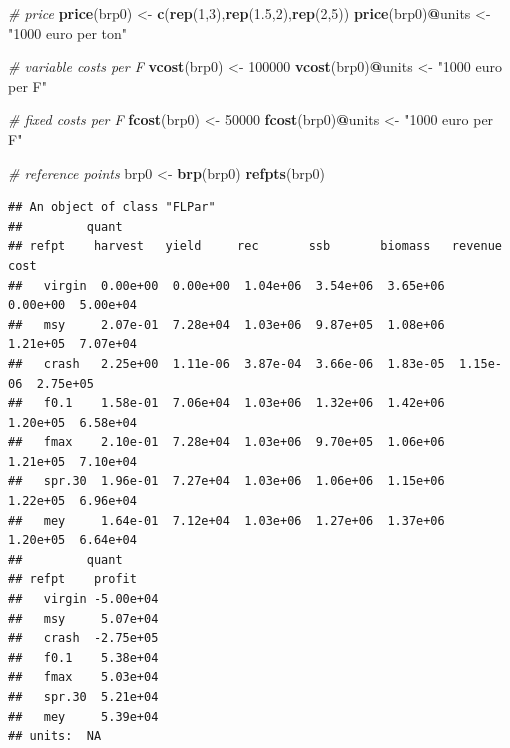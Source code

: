 \documentclass[
]{book}
\newenvironment{Shaded}{\begin{snugshade}}{\end{snugshade}}
\newcommand{\CommentTok}[1]{\textcolor[rgb]{0.56,0.35,0.01}{\textit{#1}}}
\newcommand{\DecValTok}[1]{\textcolor[rgb]{0.00,0.00,0.81}{#1}}
\newcommand{\FloatTok}[1]{\textcolor[rgb]{0.00,0.00,0.81}{#1}}
\newcommand{\FunctionTok}[1]{\textcolor[rgb]{0.13,0.29,0.53}{\textbf{#1}}}
\newcommand{\NormalTok}[1]{#1}
\newcommand{\OtherTok}[1]{\textcolor[rgb]{0.56,0.35,0.01}{#1}}
\newcommand{\SpecialCharTok}[1]{\textcolor[rgb]{0.81,0.36,0.00}{\textbf{#1}}}
\newcommand{\StringTok}[1]{\textcolor[rgb]{0.31,0.60,0.02}{#1}}
\begin{document}
\begin{Shaded}
\begin{Highlighting}[]
\CommentTok{\# price}
\FunctionTok{price}\NormalTok{(brp0) }\OtherTok{\textless{}{-}} \FunctionTok{c}\NormalTok{(}\FunctionTok{rep}\NormalTok{(}\DecValTok{1}\NormalTok{,}\DecValTok{3}\NormalTok{),}\FunctionTok{rep}\NormalTok{(}\FloatTok{1.5}\NormalTok{,}\DecValTok{2}\NormalTok{),}\FunctionTok{rep}\NormalTok{(}\DecValTok{2}\NormalTok{,}\DecValTok{5}\NormalTok{))}
\FunctionTok{price}\NormalTok{(brp0)}\SpecialCharTok{@}\NormalTok{units }\OtherTok{\textless{}{-}} \StringTok{"1000 euro per ton"}

\CommentTok{\# variable costs per F }
\FunctionTok{vcost}\NormalTok{(brp0) }\OtherTok{\textless{}{-}} \DecValTok{100000}
\FunctionTok{vcost}\NormalTok{(brp0)}\SpecialCharTok{@}\NormalTok{units }\OtherTok{\textless{}{-}} \StringTok{"1000 euro per F"}

\CommentTok{\# fixed costs per F }
\FunctionTok{fcost}\NormalTok{(brp0) }\OtherTok{\textless{}{-}} \DecValTok{50000}
\FunctionTok{fcost}\NormalTok{(brp0)}\SpecialCharTok{@}\NormalTok{units }\OtherTok{\textless{}{-}} \StringTok{"1000 euro per F"}

\CommentTok{\# reference points}
\NormalTok{brp0 }\OtherTok{\textless{}{-}} \FunctionTok{brp}\NormalTok{(brp0)}
\FunctionTok{refpts}\NormalTok{(brp0)}
\end{Highlighting}
\end{Shaded}

\begin{verbatim}
## An object of class "FLPar"
##         quant
## refpt    harvest   yield     rec       ssb       biomass   revenue   cost     
##   virgin  0.00e+00  0.00e+00  1.04e+06  3.54e+06  3.65e+06  0.00e+00  5.00e+04
##   msy     2.07e-01  7.28e+04  1.03e+06  9.87e+05  1.08e+06  1.21e+05  7.07e+04
##   crash   2.25e+00  1.11e-06  3.87e-04  3.66e-06  1.83e-05  1.15e-06  2.75e+05
##   f0.1    1.58e-01  7.06e+04  1.03e+06  1.32e+06  1.42e+06  1.20e+05  6.58e+04
##   fmax    2.10e-01  7.28e+04  1.03e+06  9.70e+05  1.06e+06  1.21e+05  7.10e+04
##   spr.30  1.96e-01  7.27e+04  1.03e+06  1.06e+06  1.15e+06  1.22e+05  6.96e+04
##   mey     1.64e-01  7.12e+04  1.03e+06  1.27e+06  1.37e+06  1.20e+05  6.64e+04
##         quant
## refpt    profit   
##   virgin -5.00e+04
##   msy     5.07e+04
##   crash  -2.75e+05
##   f0.1    5.38e+04
##   fmax    5.03e+04
##   spr.30  5.21e+04
##   mey     5.39e+04
## units:  NA
\end{verbatim}
\end{document}
